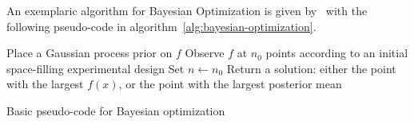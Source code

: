 An exemplaric algorithm for Bayesian Optimization is given by~\textcite{Frazier-Bayesian-Optimization} with the following pseudo-code in algorithm~\ref{alg:bayesian-optimization}.
\begin{algorithm}[ht!]
    \SetAlgoLined
    \DontPrintSemicolon
    Place a Gaussian process prior on $f$\;
    Observe $f$ at $n_0$ points according to an initial space-filling experimental design\;
    Set $n \leftarrow n_0$\;
    Return a solution: either the point with the largest $f(x)$, or the point with the largest posterior mean\;
    \caption{Basic pseudo-code for Bayesian optimization}
    \label{alg:bayesian-optimization}
\end{algorithm}

